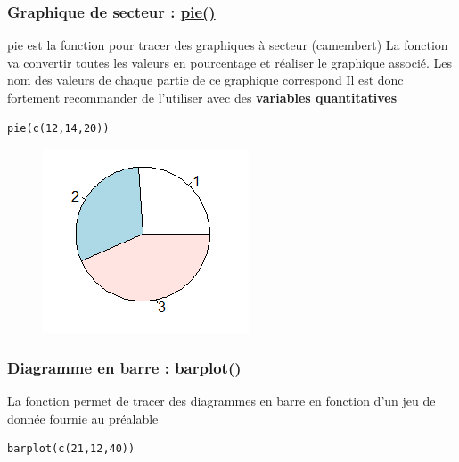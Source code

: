 \documentclass{article}
\begin{document}
\subsubsection{Graphique de secteur : \href{https://www.rdocumentation.org/packages/graphics/versions/3.6.2/topics/pie}{pie()} }
pie est la fonction pour tracer des graphiques à secteur (camembert) \newline
La fonction va convertir toutes les valeurs en pourcentage et réaliser le graphique associé. Les nom des valeurs de chaque partie de ce graphique correspond  Il est donc fortement recommander de l'utiliser avec des \textbf{variables quantitatives}

\begin{verbatim}
pie(c(12,14,20))
\end{verbatim}

\begin{figure}[!h]
\centering
    \includegraphics[scale = 0.6]{secteur.PNG}
\end{figure}

\newpage

\subsubsection{Diagramme en barre : \href{https://www.rdocumentation.org/packages/graphics/versions/3.6.2/topics/barplot}{barplot()} }
La fonction permet de tracer des diagrammes en barre en fonction d'un jeu de donnée fournie au préalable

\begin{verbatim}
barplot(c(21,12,40))
\end{verbatim}
\end{document}
